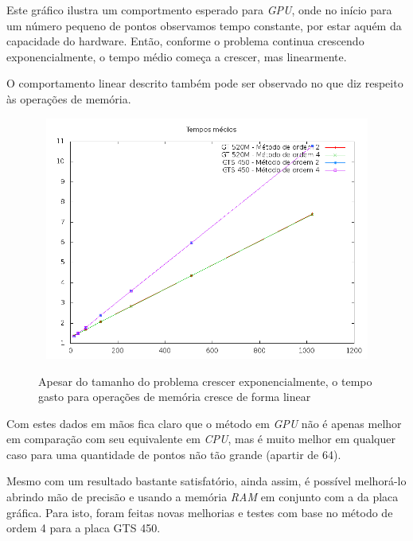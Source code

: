   Este gráfico ilustra um comportmento esperado para \textit{GPU}, onde no início para um número pequeno de pontos observamos tempo constante, por estar aquém da capacidade do hardware. Então, conforme o problema continua crescendo exponencialmente, o tempo médio começa a crescer, mas linearmente.
  
  \newpage
  O comportamento linear descrito também pode ser observado no que diz respeito às operações de memória.
  
  \begin{figure}[!h]
    \begin{center}
       \includegraphics[width=120mm, height=80mm]{images/gpu-memo-means-double.png}
       \label{fig:gpu-memo-means-double}
       \caption{Apesar do tamanho do problema crescer exponencialmente, o tempo gasto para operações de memória cresce de forma linear}
    \end{center}
  \end{figure}
  
  Com estes dados em mãos fica claro que o método em \textit{GPU} não é apenas melhor em comparação com seu equivalente em \textit{CPU}, mas é muito melhor em qualquer caso para uma quantidade de pontos não tão grande (apartir de 64).
  
  Mesmo com um resultado bastante satisfatório, ainda assim, é possível melhorá-lo abrindo mão de precisão e usando a memória \textit{RAM} em conjunto com a da placa gráfica. Para isto, foram feitas novas melhorias e testes com base no método de ordem 4 para a placa GTS 450.

